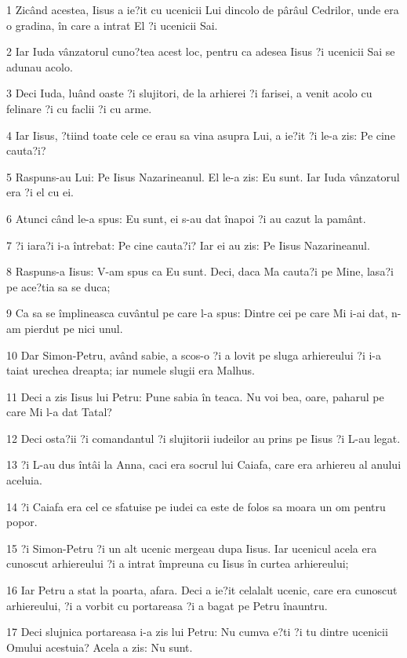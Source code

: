\par 1 Zicând acestea, Iisus a ie?it cu ucenicii Lui dincolo de pârâul Cedrilor, unde era o gradina, în care a intrat El ?i ucenicii Sai.
\par 2 Iar Iuda vânzatorul cuno?tea acest loc, pentru ca adesea Iisus ?i ucenicii Sai se adunau acolo.
\par 3 Deci Iuda, luând oaste ?i slujitori, de la arhierei ?i farisei, a venit acolo cu felinare ?i cu faclii ?i cu arme.
\par 4 Iar Iisus, ?tiind toate cele ce erau sa vina asupra Lui, a ie?it ?i le-a zis: Pe cine cauta?i?
\par 5 Raspuns-au Lui: Pe Iisus Nazarineanul. El le-a zis: Eu sunt. Iar Iuda vânzatorul era ?i el cu ei.
\par 6 Atunci când le-a spus: Eu sunt, ei s-au dat înapoi ?i au cazut la pamânt.
\par 7 ?i iara?i i-a întrebat: Pe cine cauta?i? Iar ei au zis: Pe Iisus Nazarineanul.
\par 8 Raspuns-a Iisus: V-am spus ca Eu sunt. Deci, daca Ma cauta?i pe Mine, lasa?i pe ace?tia sa se duca;
\par 9 Ca sa se împlineasca cuvântul pe care l-a spus: Dintre cei pe care Mi i-ai dat, n-am pierdut pe nici unul.
\par 10 Dar Simon-Petru, având sabie, a scos-o ?i a lovit pe sluga arhiereului ?i i-a taiat urechea dreapta; iar numele slugii era Malhus.
\par 11 Deci a zis Iisus lui Petru: Pune sabia în teaca. Nu voi bea, oare, paharul pe care Mi l-a dat Tatal?
\par 12 Deci osta?ii ?i comandantul ?i slujitorii iudeilor au prins pe Iisus ?i L-au legat.
\par 13 ?i L-au dus întâi la Anna, caci era socrul lui Caiafa, care era arhiereu al anului aceluia.
\par 14 ?i Caiafa era cel ce sfatuise pe iudei ca este de folos sa moara un om pentru popor.
\par 15 ?i Simon-Petru ?i un alt ucenic mergeau dupa Iisus. Iar ucenicul acela era cunoscut arhiereului ?i a intrat împreuna cu Iisus în curtea arhiereului;
\par 16 Iar Petru a stat la poarta, afara. Deci a ie?it celalalt ucenic, care era cunoscut arhiereului, ?i a vorbit cu portareasa ?i a bagat pe Petru înauntru.
\par 17 Deci slujnica portareasa i-a zis lui Petru: Nu cumva e?ti ?i tu dintre ucenicii Omului acestuia? Acela a zis: Nu sunt.
